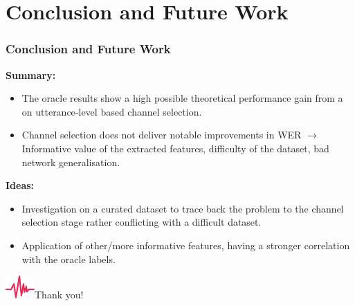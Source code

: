 \documentclass{beamer}
\newcommand{\backupbegin}{
\newcounter{finalframe}
\setcounter{finalframe}{\value{framenumber}}
}
\begin{document}
\section{Conclusion and Future Work}
\begin{frame}
  \frametitle{Conclusion and Future Work}
  
  \textbf{Summary:}

  \begin{itemize} 
    \item The oracle results show a high possible theoretical performance gain from a on utterance-level based channel selection.
    \item Channel selection does not deliver notable improvements in WER \textcolor{tug_red}{$\rightarrow$ Informative value of the extracted features, difficulty of the dataset, bad network generalisation}. 
  \end{itemize}
  
  \textbf{Ideas:}
  \begin{itemize}
    \item Investigation on a curated dataset to trace back the problem to the channel selection stage rather conflicting with a difficult dataset.
    \item Application of other/more informative features, having a stronger correlation with the oracle labels. 
  \end{itemize}
  
\end{frame}

\appendix
\backupbegin
\begin{frame}[plain]
  \centering
  \vspace{1.5em}
  \includegraphics[width=3em]{img/speechwave}\Huge Thank you!
\end{frame}


\bgroup
{}
\begin{frame}[plain]{}
\end{frame}
\egroup
\end{document}
